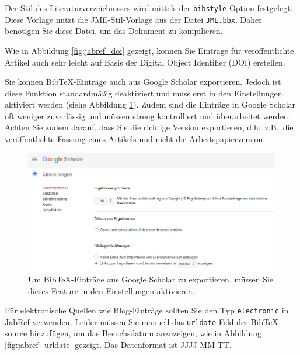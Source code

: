 \documentclass[a4paper,12pt]{scrartcl} %
\begin{document}
Der Stil des Literaturverzeichnisses wird mittels der \verb|bibstyle|-Option festgelegt. Diese Vorlage nutzt die JME-Stil-Vorlage aus der Datei \texttt{JME.bbx}. Daher benötigen Sie diese Datei, um das Dokument zu kompilieren.

Wie in Abbildung \ref{fig:jabref_doi} gezeigt, können Sie Einträge für veröffentlichte Artikel auch sehr leicht auf Basis der Digital Object Identifier (DOI) erstellen.

Sie können Bib\TeX-Einträge auch aus Google Scholar exportieren. Jedoch ist diese Funktion standardmäßig deaktiviert und muss erst in den Einstellungen aktiviert werden (siehe Abbildung \ref{fig:scholar}). Zudem sind die Einträge in Google Scholar oft weniger zuverlässig und müssen streng kontrolliert und überarbeitet werden. Achten Sie zudem darauf, dass Sie die richtige Version exportieren, d.h.\ z.B.\ die veröffentlichte Fassung eines Artikels und nicht die Arbeitspapierversion.

\begin{figure}[th!]
\includegraphics[width=16cm]{Scholar}
\caption[Google Scholar]{Um Bib\TeX-Einträge aus Google Scholar zu exportieren, müssen Sie dieses Feature in den Einstellungen aktivieren.}\label{fig:scholar}
\end{figure}

Für elektronische Quellen wie Blog-Einträge \parencite[e.g.\ ][]{Krugman2012} sollten Sie den Typ \texttt{electronic} in JabRef verwenden. Leider müssen Sie manuell das \texttt{urldate}-Feld der Bib\TeX-source hinzufügen, um das Besuchsdatum anzuzeigen, wie in Abbildung \ref{fig:jabref_urldate} gezeigt. Das Datenformat ist JJJJ-MM-TT.
\end{document}

